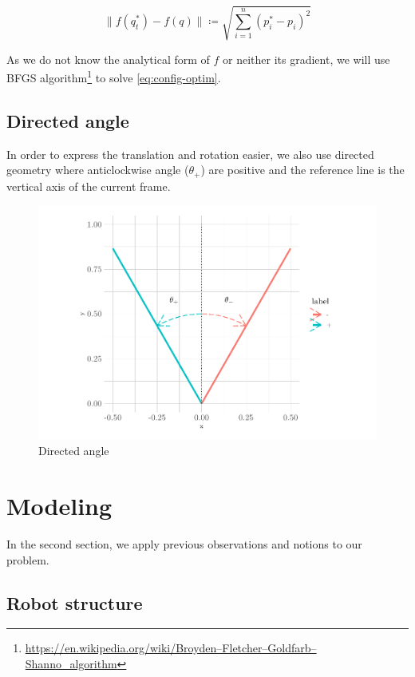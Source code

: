 \documentclass[a4paper, xcolor = usenames,dvipsnames]{article}
\begin{document}
\[
\| f(q_{t}^{*}) - f(q) \| \coloneqq \sqrt{\sum_{i=1}^{n} (p_{i}^{*} - p_{i})^{2}}
\]

As we do not know the analytical form of \(f\) or neither its gradient, we will use BFGS algorithm\footnote{\url{https://en.wikipedia.org/wiki/Broyden–Fletcher–Goldfarb–Shanno_algorithm}} to solve \eqref{eq:config-optim}.

\hypertarget{directed-angle}{%
\subsection{Directed angle}\label{directed-angle}}

In order to express the translation and rotation easier, we also use directed geometry where anticlockwise angle (\(\theta_{+}\)) are positive and the reference line is the vertical axis of the current frame.

\begin{figure}

{\centering \includegraphics{report_files/figure-latex/angle-plot-1} 

}

\caption{Directed angle}\label{fig:angle-plot}
\end{figure}

\hypertarget{modeling}{%
\section{Modeling}\label{modeling}}

In the second section, we apply previous observations and notions to our problem.

\hypertarget{robot-structure}{%
\subsection{Robot structure}\label{robot-structure}}
\end{document}
